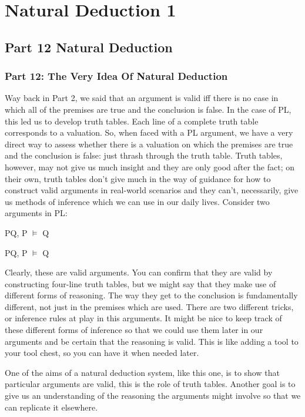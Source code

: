 \part{Natural Deduction 1}
\label{ch.plnd1}
\chapter{Part 12 Natural Deduction}
\section{Part 12: The Very Idea Of Natural Deduction}
Way back in Part 2, we said that an argument is valid iff there is no case in which all of the premises are true and the conclusion is false. In the case of PL, this led us to develop truth tables. Each line of a complete truth table corresponds to a valuation. So, when faced with a PL argument, we have a very direct way to assess whether there is a valuation on which the premises are true and the conclusion is false: just thrash through the truth table. Truth tables, however, may not give us much insight and they are only good after the fact; on their own, truth tables don't give much in the way of guidance for how to construct valid arguments in real-world scenarios and they can't, necessarily, give us methods of inference which we can use in our daily lives. Consider two arguments in PL:
\begin{earg}
\item[]P\eor Q, \enot P $\vDash$ Q
\item[]P\eif Q, P $\vDash$ Q
\end{earg}
Clearly, these are valid arguments. You can confirm that they are valid by constructing four-line truth tables, but we might say that they make use of different forms of reasoning. The way they get to the conclusion is fundamentally different, not just in the premises which are used. There are two different tricks, or inference rules at play in this arguments. It might be nice to keep track of these different forms of inference so that we could use them later in our arguments and be certain that the reasoning is valid. This is like adding a tool to your tool chest, so you can have it when needed later.

One of the aims of a natural deduction system, like this one, is to show that particular arguments are valid, this is the role of truth tables. Another goal is to give us an understanding of the reasoning the arguments might involve so that we can replicate it elsewhere.

